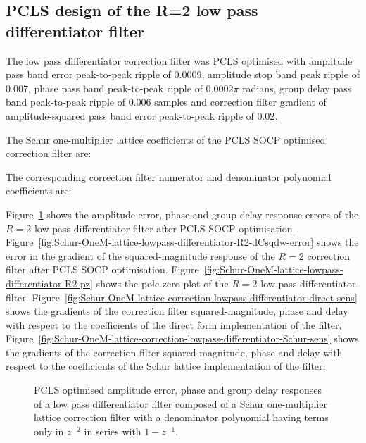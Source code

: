 \documentclass[a4paper,twoside,10pt,english]{article}
\newcommand{\DesignOfSchurLatticeFiltersPdfScale}{1}
\begin{document}
\subsection{PCLS design of the R=2 low pass differentiator filter}
The low pass differentiator correction filter was PCLS optimised with 
amplitude pass band error peak-to-peak ripple of $0.0009$,
amplitude stop band peak ripple of $0.007$,
phase pass band peak-to-peak ripple of $0.0002\pi$\; radians,
group delay pass band peak-to-peak ripple of $0.006$\; samples and
correction filter gradient of amplitude-squared pass band error peak-to-peak
ripple of $0.02$.

The Schur one-multiplier lattice coefficients of the PCLS SOCP optimised
correction filter are:
\begin{small}



\end{small}

The corresponding correction filter numerator and denominator polynomial
coefficients are:
\begin{small}


\end{small}
Figure~\ref{fig:Schur-OneM-lattice-lowpass-differentiator-R2}
shows the  amplitude error, phase and group delay response errors of the $R=2$
low pass differentiator filter after PCLS SOCP optimisation.
Figure~\ref{fig:Schur-OneM-lattice-lowpass-differentiator-R2-dCsqdw-error}
shows the error in the gradient of the squared-magnitude response of the $R=2$
correction filter after PCLS SOCP optimisation.
Figure~\ref{fig:Schur-OneM-lattice-lowpass-differentiator-R2-pz} shows
the pole-zero plot of the $R=2$ low pass differentiator filter.
Figure~\ref{fig:Schur-OneM-lattice-correction-lowpass-differentiator-direct-sens}
shows the gradients of the correction filter squared-magnitude, phase and delay
with respect to the coefficients of the direct form implementation of the filter.
Figure~\ref{fig:Schur-OneM-lattice-correction-lowpass-differentiator-Schur-sens}
shows the gradients of the correction filter squared-magnitude, phase and delay
with respect to the coefficients of the Schur lattice implementation of the
filter.

\begin{figure}
\centering
\scalebox{\DesignOfSchurLatticeFiltersPdfScale}{}
\caption{PCLS optimised amplitude error, phase and group delay responses of a
  low pass differentiator filter composed of a Schur one-multiplier lattice
  correction filter with a denominator polynomial having terms only in $z^{-2}$
  in series with $1-z^{-1}$.}
\label{fig:Schur-OneM-lattice-lowpass-differentiator-R2}
\end{figure}
\end{document}
